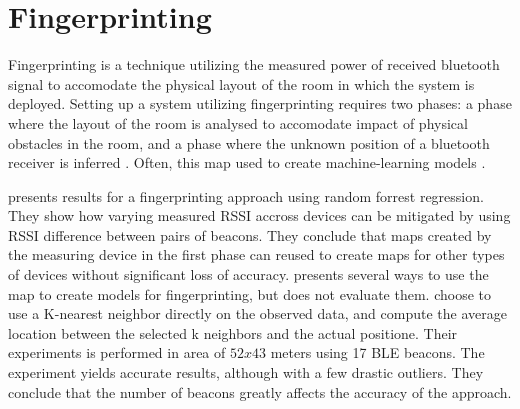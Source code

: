 \section{Fingerprinting}
Fingerprinting is a technique utilizing the measured power of received bluetooth signal to accomodate the physical layout of the room in which the system is deployed. 
Setting up a system utilizing fingerprinting requires two phases: a phase where the layout of the room is analysed to accomodate impact of physical obstacles in the room, and a phase where the unknown position of a bluetooth receiver is inferred \cite{presence_ble_review, taking_localization_to_the_wild}. Often, this map used to create machine-learning models \cite{taking_localization_to_the_wild}.

\citeauthor{taking_localization_to_the_wild} \cite{taking_localization_to_the_wild} presents results for a fingerprinting approach using random forrest regression.
They show how varying measured RSSI accross devices can be mitigated by using RSSI difference between pairs of beacons.
They conclude that maps created by the measuring device in the first phase can reused to create maps for other types of devices without significant loss of accuracy. 
\citeauthor{presence_ble_review}\cite{presence_ble_review} presents several ways to use the map to create models for fingerprinting, but does not evaluate them.
\citeauthor{improving_indoor_localization} \cite{improving_indoor_localization} choose to use a K-nearest neighbor directly on the observed data, and compute the average  location between the selected k neighbors and the actual positione. 
Their experiments is performed in area of $52x43$ meters using 17 BLE beacons.
The experiment yields accurate results, although with a few drastic outliers. 
They conclude that the number of beacons greatly affects the accuracy of the approach. 


